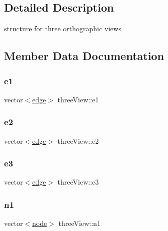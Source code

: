 \subsection{Detailed Description}
structure for three orthographic views 

\subsection{Member Data Documentation}
\mbox{\label{structthreeView_a2daeb560cb38121dad37eea20d81e6a0}} 
\subsubsection{\texorpdfstring{e1}{e1}}
{\footnotesize\ttfamily vector$<$\hyperlink{structedge}{edge}$>$ three\+View\+::e1}

\mbox{\label{structthreeView_a67b7c6877d44054bd495f5686b35b6a8}} 
\subsubsection{\texorpdfstring{e2}{e2}}
{\footnotesize\ttfamily vector$<$\hyperlink{structedge}{edge}$>$ three\+View\+::e2}

\mbox{\label{structthreeView_a28b42f3d940b24536915a3e2922dfcb5}} 
\subsubsection{\texorpdfstring{e3}{e3}}
{\footnotesize\ttfamily vector$<$\hyperlink{structedge}{edge}$>$ three\+View\+::e3}

\mbox{\label{structthreeView_a8ac9e4dcf5da34db07c3a1847a2e16ed}} 
\subsubsection{\texorpdfstring{n1}{n1}}
{\footnotesize\ttfamily vector$<$\hyperlink{structnode}{node}$>$ three\+View\+::n1}

